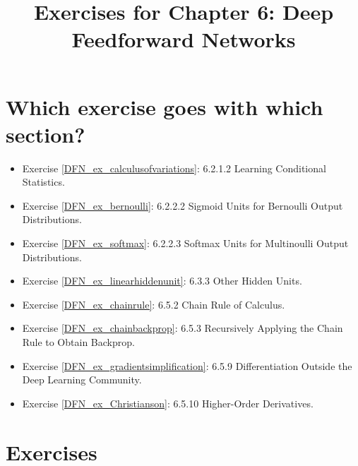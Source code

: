 \documentclass{article}
\title{Exercises for Chapter 6: Deep Feedforward Networks}
\begin{document}
\maketitle

\section*{Which exercise goes with which section?}
\begin{itemize}
    \item Exercise \ref{DFN_ex_calculusofvariations}: 6.2.1.2 Learning Conditional Statistics.
    \item Exercise \ref{DFN_ex_bernoulli}: 6.2.2.2 Sigmoid Units for Bernoulli Output Distributions.
    \item Exercise \ref{DFN_ex_softmax}: 6.2.2.3 Softmax Units for Multinoulli Output Distributions.
    \item Exercise \ref{DFN_ex_linearhiddenunit}: 6.3.3 Other Hidden Units.
    \item Exercise \ref{DFN_ex_chainrule}: 6.5.2 Chain Rule of Calculus.
    \item Exercise \ref{DFN_ex_chainbackprop}: 6.5.3 Recursively Applying the Chain Rule to Obtain Backprop.
    \item Exercise \ref{DFN_ex_gradientsimplification}: 6.5.9 Differentiation Outside the Deep Learning Community.
    \item Exercise \ref{DFN_ex_Christianson}: 6.5.10 Higher-Order Derivatives.
\end{itemize}
    
\section*{Exercises}
\end{document}
